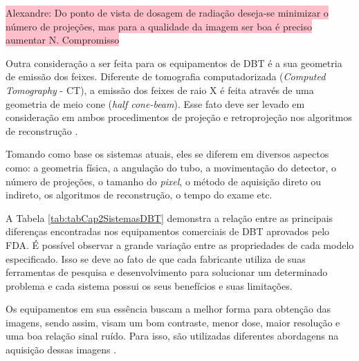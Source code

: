 \colorbox{pink}{Alexandre: Do ponto de vista de dosagem de radiação deseja-se minimizar o número de projeções, mas para a qualidade da imagem ser boa é preciso aumentar N. Compromisso} 

Outra consideração a ser feita para os equipamentos de \acs{DBT} é a sua geometria de emissão dos feixes. Diferente de tomografia computadorizada (\textit{Computed Tomography} - \acs{CT}), a emissão dos feixes de raio X é feita através de uma geometria de meio cone (\textit{half cone-beam}). Esse fato deve ser levado em consideração em ambos procedimentos de projeção e retroprojeção nos algoritmos de reconstrução \cite{wu2004comparison}. 
    
Tomando como base os sistemas atuais, eles se diferem em diversos aspectos como: a geometria física, a angulação do tubo, a movimentação do detector, o número de projeções, o tamanho do \textit{pixel}, o método de aquisição direto ou indireto, os algoritmos de reconstrução, o tempo do exame etc. 

A Tabela \ref{tab:tabCap2SistemasDBT} demonstra a relação entre as principais diferenças encontradas nos equipamentos comerciais de \acs{DBT} aprovados pelo \acs{FDA}. É possível observar a grande variação entre as propriedades de cada modelo especificado. Isso se deve ao fato de que cada fabricante utiliza de suas ferramentas de pesquisa e desenvolvimento para solucionar um determinado problema e cada sistema possui os seus benefícios e suas limitações. 

Os equipamentos em sua essência buscam a melhor forma para obtenção das imagens, sendo assim, visam um bom contraste, menor dose, maior resolução  e uma boa relação sinal ruído. Para isso, são utilizadas diferentes abordagens na aquisição dessas imagens \cite{vedantham2015digital}. 

